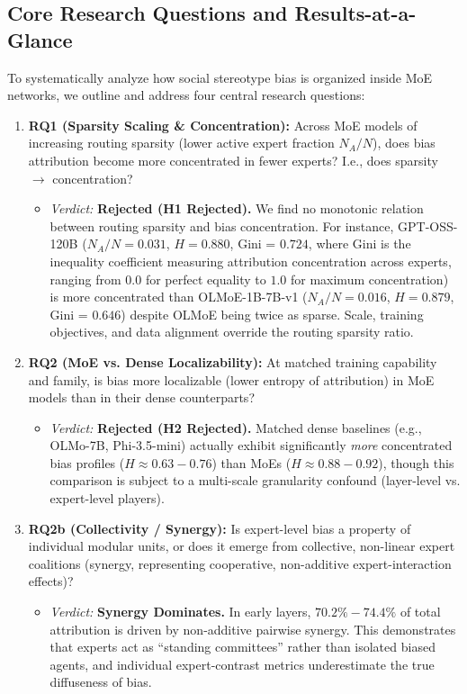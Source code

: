 \documentclass[11pt,a4paper]{article}
\begin{document}
\subsection{Core Research Questions and Results-at-a-Glance}
To systematically analyze how social stereotype bias is organized inside MoE networks, we outline and address four central research questions:

\begin{enumerate}
    \item \textbf{RQ1 (Sparsity Scaling \& Concentration):} Across MoE models of increasing routing sparsity (lower active expert fraction $N_A/N$), does bias attribution become more concentrated in fewer experts? I.e., does sparsity $\rightarrow$ concentration?
    \begin{itemize}
        \item \textit{Verdict:} \textbf{Rejected (H1 Rejected).} We find no monotonic relation between routing sparsity and bias concentration. For instance, GPT-OSS-120B ($N_A/N = 0.031$, $H = 0.880$, Gini = $0.724$, where Gini is the inequality coefficient measuring attribution concentration across experts, ranging from $0.0$ for perfect equality to $1.0$ for maximum concentration) is more concentrated than OLMoE-1B-7B-v1 ($N_A/N = 0.016$, $H = 0.879$, Gini = $0.646$) despite OLMoE being twice as sparse. Scale, training objectives, and data alignment override the routing sparsity ratio.
    \end{itemize}
    
    \item \textbf{RQ2 (MoE vs. Dense Localizability):} At matched training capability and family, is bias more localizable (lower entropy of attribution) in MoE models than in their dense counterparts?
    \begin{itemize}
        \item \textit{Verdict:} \textbf{Rejected (H2 Rejected).} Matched dense baselines (e.g., OLMo-7B, Phi-3.5-mini) actually exhibit significantly \textit{more} concentrated bias profiles ($H \approx 0.63 - 0.76$) than MoEs ($H \approx 0.88 - 0.92$), though this comparison is subject to a multi-scale granularity confound (layer-level vs. expert-level players).
    \end{itemize}
    
    \item \textbf{RQ2b (Collectivity / Synergy):} Is expert-level bias a property of individual modular units, or does it emerge from collective, non-linear expert coalitions (synergy, representing cooperative, non-additive expert-interaction effects)?
    \begin{itemize}
        \item \textit{Verdict:} \textbf{Synergy Dominates.} In early layers, $70.2\% - 74.4\%$ of total attribution is driven by non-additive pairwise synergy. This demonstrates that experts act as ``standing committees'' rather than isolated biased agents, and individual expert-contrast metrics underestimate the true diffuseness of bias.
    \end{itemize}
    

\end{enumerate}
\end{document}

